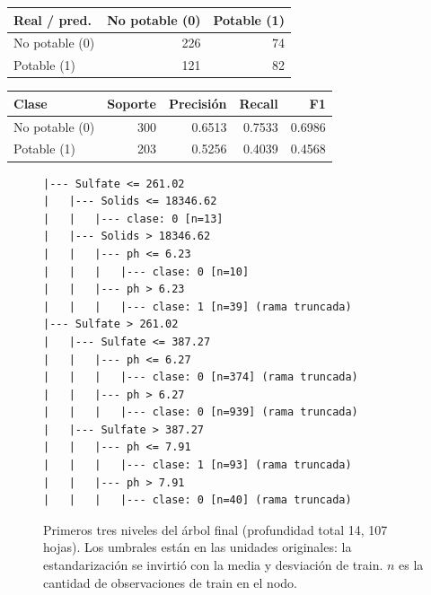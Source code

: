 \documentclass[11pt]{article}
\begin{document}
\begin{table}[H]\footnotesize\begin{minipage}[t]{0.44\linewidth}\centering{}\begin{tabular}{lrr}\toprule
Real / pred. & No potable (0) & Potable (1) \\ \midrule
No potable (0) & 226 & 74 \\
Potable (1) & 121 & 82 \\
\bottomrule\end{tabular}\end{minipage}\hfill\begin{minipage}[t]{0.52\linewidth}\centering{}\begin{tabular}{lrrrr}\toprule
Clase & Soporte & Precisión & Recall & F1 \\ \midrule
No potable (0) & 300 & 0.6513 & 0.7533 & 0.6986 \\
Potable (1) & 203 & 0.5256 & 0.4039 & 0.4568 \\
\bottomrule\end{tabular}\end{minipage}\end{table}

\begin{figure}[H]\centering\begin{minipage}{0.92\linewidth}\scriptsize\begin{verbatim}
|--- Sulfate <= 261.02
|   |--- Solids <= 18346.62
|   |   |--- clase: 0 [n=13]
|   |--- Solids > 18346.62
|   |   |--- ph <= 6.23
|   |   |   |--- clase: 0 [n=10]
|   |   |--- ph > 6.23
|   |   |   |--- clase: 1 [n=39] (rama truncada)
|--- Sulfate > 261.02
|   |--- Sulfate <= 387.27
|   |   |--- ph <= 6.27
|   |   |   |--- clase: 0 [n=374] (rama truncada)
|   |   |--- ph > 6.27
|   |   |   |--- clase: 0 [n=939] (rama truncada)
|   |--- Sulfate > 387.27
|   |   |--- ph <= 7.91
|   |   |   |--- clase: 1 [n=93] (rama truncada)
|   |   |--- ph > 7.91
|   |   |   |--- clase: 0 [n=40] (rama truncada)
\end{verbatim}\end{minipage}\caption{Primeros tres niveles del árbol final (profundidad total 14, 107 hojas). Los umbrales están en las unidades originales: la estandarización se invirtió con la media y desviación de train. $n$ es la cantidad de observaciones de train en el nodo.}\end{figure}
\end{document}
